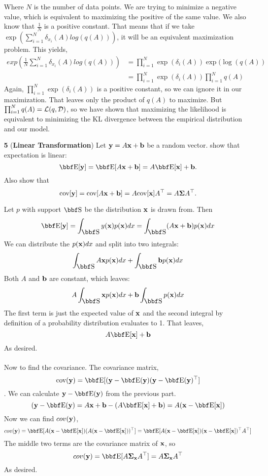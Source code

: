 \documentclass[12pt,letterpaper,fleqn]{hmcpset}
\begin{document}
Where $N$ is the number of data points. We are trying to minimize a negative value, which is equivalent to maximizing the positive of the same value. We also know that $\frac{1}{N}$ is a positive constant. That means that if we take $\exp(\sum_{i=1}^{N}\delta_{x_i}(A)log(q(A)))$, it will be an equivalent maximization problem. This yields,
\begin{align*}
    exp(\frac{1}{N}\sum_{i=1}^{N}\delta_{x_i}(A)log(q(A))) &= \prod_{i=1}^N \exp(\delta_i(A))\exp(\log(q(A))\\
    &= \prod_{i=1}^N \exp(\delta_i(A)) \prod_{i=1}^N q(A)
\end{align*}
Again, $\prod_{i=1}^N \exp(\delta_i(A))$ is a positive constant, so we can ignore it in our maximization. That leaves only the product of $q(A)$ to maximize. But $\prod_{i=1}^N q(A) = {\cal L}(q,{\cal D})$, so we have shown that maximizing the likelihood is equivalent to minimizing the KL divergence between the empirical distribution and our model.

\newpage

\textbf{5} (\textbf{Linear Transformation}) Let ${\bf y} = A{\bf x} + {\bf b}$ be a random vector.
show that expectation is linear:
\[
    \EE[\yy] = \EE[A\xx + \bb] = A\EE[\xx] + \bb.
\]
Also show that
\[
    {\hbox{cov}}[{\bf y}] = {\hbox{cov}}[A{\bf x} + {\bf b}] = A {\hbox{cov}}[{\bf x}] A^\top = A\hbox{\boldmath$\Sigma$} A^\top.
\]

\vspace{10mm}

Let $p$ with support $\SS$ be the distribution ${\bf x}$ is drawn from. Then
	$$\EE[\yy] = \int_{\SS} y(\xx) p(\xx)dx = \int_{\SS} (A\xx + \bb) p(\xx)dx$$
We can distribute the $p({\bf x})dx$ and split into two integrals:
	$$\int_{\SS} A\xx p(\xx)dx + \int_{\SS} \bb p(\xx)dx$$
Both $A$ and ${\bf b}$ are constant, which leaves:
	$$A \int_{\SS} \xx p(\xx)dx + \bb \int_{\SS}  p(\xx)dx$$
The first term is just the expected value of ${\bf x}$ and the second integral by definition of a probability distribution evaluates to 1. That leaves,
	$$A\EE[\xx] + \bb$$
As desired.\\\\

Now to find the covariance. The covariance matrix,
    $$\cov(\yy) = \EE[(\yy - \EE(\yy)(\yy - \EE(\yy)^\T]$$. 
We can calculate $\yy - \EE(\yy)$ from the previous part.
    $$(\yy - \EE(\yy) = A\xx + \bb - (A\EE[\xx] + \bb) = A(\xx - \EE[\xx])$$
Now we can find $cov({\bf y})$,
    $$cov(\yy) = \EE[A(\xx - \EE[\xx])(A(\xx - \EE[\xx]))^\T] = \EE[A(\xx - \EE[\xx])(\xx - \EE[\xx])^\T A^\T]$$
The middle two terms are the covariance matrix of ${\bf x}$, so
    $$cov(\yy) = \EE[A\Sigmab_\xx A^\T] = A\Sigmab_\xx A^\T$$
As desired.
\end{document}
